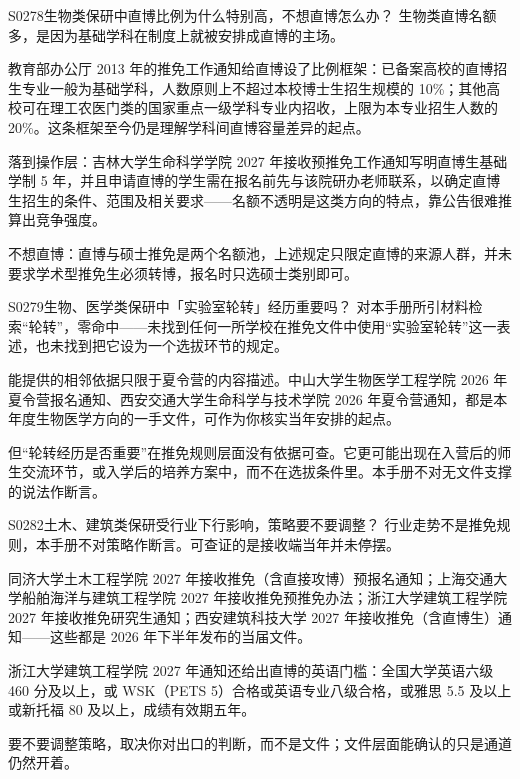 \begin{qa}{S0278}{生物类保研中直博比例为什么特别高，不想直博怎么办？}
生物类直博名额多，是因为基础学科在制度上就被安排成直博的主场。

教育部办公厅 2013 年的推免工作通知给直博设了比例框架：已备案高校的直博招生专业一般为基础学科，人数原则上不超过本校博士生招生规模的 10\%；其他高校可在理工农医门类的国家重点一级学科专业内招收，上限为本专业招生人数的 20\%。这条框架至今仍是理解学科间直博容量差异的起点。

落到操作层：吉林大学生命科学学院 2027 年接收预推免工作通知写明直博生基础学制 5 年，并且申请直博的学生需在报名前先与该院研办老师联系，以确定直博生招生的条件、范围及相关要求——名额不透明是这类方向的特点，靠公告很难推算出竞争强度。

不想直博：直博与硕士推免是两个名额池，上述规定只限定直博的来源人群，并未要求学术型推免生必须转博，报名时只选硕士类别即可。
\end{qa}

\begin{qa}{S0279}{生物、医学类保研中「实验室轮转」经历重要吗？}
对本手册所引材料检索“轮转”，零命中——未找到任何一所学校在推免文件中使用“实验室轮转”这一表述，也未找到把它设为一个选拔环节的规定。

能提供的相邻依据只限于夏令营的内容描述。中山大学生物医学工程学院 2026 年夏令营报名通知、西安交通大学生命科学与技术学院 2026 年夏令营通知，都是本年度生物医学方向的一手文件，可作为你核实当年安排的起点。

但“轮转经历是否重要”在推免规则层面没有依据可查。它更可能出现在入营后的师生交流环节，或入学后的培养方案中，而不在选拔条件里。本手册不对无文件支撑的说法作断言。
\end{qa}

\begin{qa}{S0282}{土木、建筑类保研受行业下行影响，策略要不要调整？}
行业走势不是推免规则，本手册不对策略作断言。可查证的是接收端当年并未停摆。

同济大学土木工程学院 2027 年接收推免（含直接攻博）预报名通知；上海交通大学船舶海洋与建筑工程学院 2027 年接收推免预推免办法；浙江大学建筑工程学院 2027 年接收推免研究生通知；西安建筑科技大学 2027 年接收推免（含直博生）通知——这些都是 2026 年下半年发布的当届文件。

浙江大学建筑工程学院 2027 年通知还给出直博的英语门槛：全国大学英语六级 460 分及以上，或 WSK（PETS 5）合格或英语专业八级合格，或雅思 5.5 及以上或新托福 80 及以上，成绩有效期五年。

要不要调整策略，取决你对出口的判断，而不是文件；文件层面能确认的只是通道仍然开着。
\end{qa}

